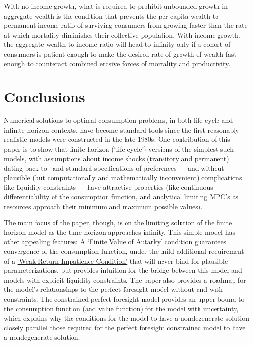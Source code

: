 \documentclass[BufferStockTheory]{subfiles}
\begin{document}
With no income growth, what is required to prohibit unbounded growth in aggregate wealth is the condition that prevents the per-capita wealth-to-permanent-income ratio of surviving consumers from growing faster than the rate at which mortality diminishes their collective population.  With income growth, the aggregate wealth-to-income ratio will head to infinity only if a cohort of consumers is patient enough to make the desired rate of growth of wealth fast enough to counteract combined erosive forces of mortality and productivity.


\hypertarget{Conclusions}{}
\section{Conclusions}

Numerical solutions to optimal consumption problems, in both life cycle and infinite horizon contexts, have become standard tools since the first reasonably realistic models were constructed in the late 1980s. One contribution of this paper is to show that finite horizon (`life cycle') versions of the simplest such models, with assumptions about income shocks (transitory and permanent) dating back to~\cite{friedmanATheory} and standard specifications of preferences --- and without plausible (but computationally and mathematically inconvenient) complications like liquidity constraints --- have attractive properties (like continuous differentiability of the consumption function, and analytical limiting MPC's as resources approach their minimum and maximum possible values).%

The main focus of the paper, though, is on the limiting solution of the finite horizon model as the time horizon approaches infinity.  This simple model has other appealing features: A \hyperlink{FVAC}{`Finite Value of Autarky'} condition guarantees convergence of the consumption function, under the mild additional requirement of a \hyperlink{WRIC}{`Weak Return Impatience Condition'} that will never bind for plausible parameterizations, but provides intuition for the bridge between this model and models with explicit liquidity constraints. The paper also provides a roadmap for the model's relationships to the perfect foresight model without and with constraints.  The constrained perfect foresight model provides an upper bound to the consumption function (and value function) for the model with uncertainty, which explains why the conditions for the model to have a nondegenerate solution closely parallel those required for the perfect foresight constrained model to have a nondegenerate solution.
\end{document}
